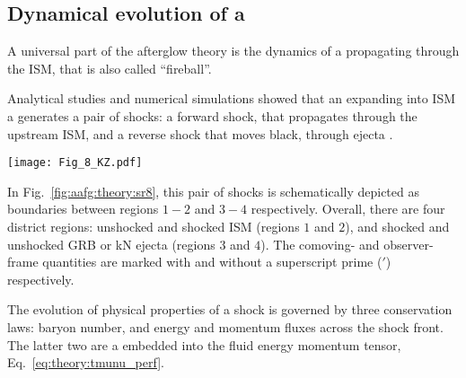 \subsection{Dynamical evolution of a \blast{}}

A universal part of the afterglow theory is the dynamics of a  
\blast{} propagating through the \ac{ISM}, that is also called ``fireball''.

Analytical studies and numerical simulations showed that an 
expanding into \ac{ISM} a \blast{} generates a pair of shocks: a forward shock, that 
propagates through the upstream \ac{ISM}, and a reverse shock that moves black, 
through ejecta \citep[\eg][]{Blandford:1976,Ayache:2021six}. 
\begin{figure*}[t]
    \centering 
    \texttt{[image: Fig\_8\_KZ.pdf]}
    \caption{
        Schematic sketch of a pair of shocks produced when a relativistic
        jet from a \ac{GRB} collides with the \ac{CBM}, as viewed from the
        rest frame of unshocked \ac{CBM}. Regions 2 \& 3 represent shocked \ac{CBM} and \ac{GRB}
        jet respectively. They move together with the same \ac{LF} ($\gamma_2$, as viewed
        by a stationary observer in the unshocked \ac{CBM}), and have the same pressure but
        different densities.
        (Adapted from \citet{Kumar:2014upa}, Fig.~8)
    }
    \label{fig:aafg:theory:sr8}
\end{figure*}
In Fig.~\ref{fig:aafg:theory:sr8}, this pair of shocks is schematically depicted as 
boundaries between regions $1-2$ and $3-4$ respectively. 
Overall, there are four district regions: unshocked and shocked \ac{ISM} (regions $1$ and $2$), 
and shocked and unshocked \ac{GRB} or \ac{kN} ejecta (regions $3$ and $4$).
The comoving- and observer-frame quantities are marked with and without a superscript prime ($'$) 
respectively. 

The evolution of physical properties of a shock is governed by three conservation laws: 
baryon number, and energy and momentum fluxes across the shock front. 
The latter two are a embedded into the fluid energy momentum tensor, Eq.~\eqref{eq:theory:tmunu_perf}. 

